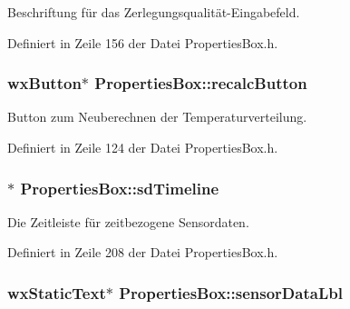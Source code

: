 Beschriftung für das Zerlegungsqualität-\/\-Eingabefeld. 



Definiert in Zeile 156 der Datei Properties\-Box.\-h.

\hypertarget{classPropertiesBox_a0f5356371cde511efeb413bc2a98e6fc}{
\subsubsection[{recalc\-Button}]{\setlength{\rightskip}{0pt plus 5cm}wx\-Button$\ast$ Properties\-Box\-::recalc\-Button\hspace{0.3cm}{\ttfamily [private]}}}\label{classPropertiesBox_a0f5356371cde511efeb413bc2a98e6fc}


Button zum Neuberechnen der Temperaturverteilung. 



Definiert in Zeile 124 der Datei Properties\-Box.\-h.

\hypertarget{classPropertiesBox_ab145e0c36e99d355f2722964da46b31a}{
\subsubsection[{sd\-Timeline}]{$\ast$ Properties\-Box\-::sd\-Timeline\hspace{0.3cm}{\ttfamily [private]}}}\label{classPropertiesBox_ab145e0c36e99d355f2722964da46b31a}


Die Zeitleiste für zeitbezogene Sensordaten. 



Definiert in Zeile 208 der Datei Properties\-Box.\-h.

\hypertarget{classPropertiesBox_ab9b6df8a3367b4b5b56ef82ab1bd7aa3}{
\subsubsection[{sensor\-Data\-Lbl}]{\setlength{\rightskip}{0pt plus 5cm}wx\-Static\-Text$\ast$ Properties\-Box\-::sensor\-Data\-Lbl\hspace{0.3cm}{\ttfamily [private]}}}\label{classPropertiesBox_ab9b6df8a3367b4b5b56ef82ab1bd7aa3}


